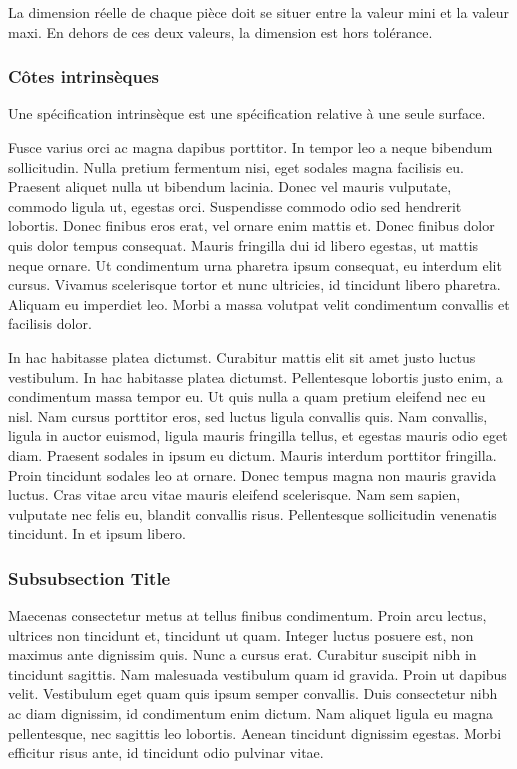 \documentclass[
	11pt, %
	fleqn, %
	a4paper, %
]{LegrandOrangeBook}
\begin{document}
  
La dimension réelle de chaque pièce doit se situer entre la valeur mini et la valeur maxi. En dehors de ces deux valeurs, la dimension est hors tolérance. 
\subsubsection{Côtes intrinsèques}
Une spécification intrinsèque est une spécification relative à une seule surface.


Fusce varius orci ac magna dapibus porttitor. In tempor leo a neque bibendum sollicitudin. Nulla pretium fermentum nisi, eget sodales magna facilisis eu. Praesent aliquet nulla ut bibendum lacinia. Donec vel mauris vulputate, commodo ligula ut, egestas orci. Suspendisse commodo odio sed hendrerit lobortis. Donec finibus eros erat, vel ornare enim mattis et. Donec finibus dolor quis dolor tempus consequat. Mauris fringilla dui id libero egestas, ut mattis neque ornare. Ut condimentum urna pharetra ipsum consequat, eu interdum elit cursus. Vivamus scelerisque tortor et nunc ultricies, id tincidunt libero pharetra. Aliquam eu imperdiet leo. Morbi a massa volutpat velit condimentum convallis et facilisis dolor.

In hac habitasse platea dictumst. Curabitur mattis elit sit amet justo luctus vestibulum. In hac habitasse platea dictumst. Pellentesque lobortis justo enim, a condimentum massa tempor eu. Ut quis nulla a quam pretium eleifend nec eu nisl. Nam cursus porttitor eros, sed luctus ligula convallis quis. Nam convallis, ligula in auctor euismod, ligula mauris fringilla tellus, et egestas mauris odio eget diam. Praesent sodales in ipsum eu dictum. Mauris interdum porttitor fringilla. Proin tincidunt sodales leo at ornare. Donec tempus magna non mauris gravida luctus. Cras vitae arcu vitae mauris eleifend scelerisque. Nam sem sapien, vulputate nec felis eu, blandit convallis risus. Pellentesque sollicitudin venenatis tincidunt. In et ipsum libero.

\subsubsection{Subsubsection Title} 

Maecenas consectetur metus at tellus finibus condimentum. Proin arcu lectus, ultrices non tincidunt et, tincidunt ut quam. Integer luctus posuere est, non maximus ante dignissim quis. Nunc a cursus erat. Curabitur suscipit nibh in tincidunt sagittis. Nam malesuada vestibulum quam id gravida. Proin ut dapibus velit. Vestibulum eget quam quis ipsum semper convallis. Duis consectetur nibh ac diam dignissim, id condimentum enim dictum. Nam aliquet ligula eu magna pellentesque, nec sagittis leo lobortis. Aenean tincidunt dignissim egestas. Morbi efficitur risus ante, id tincidunt odio pulvinar vitae.
\end{document}
